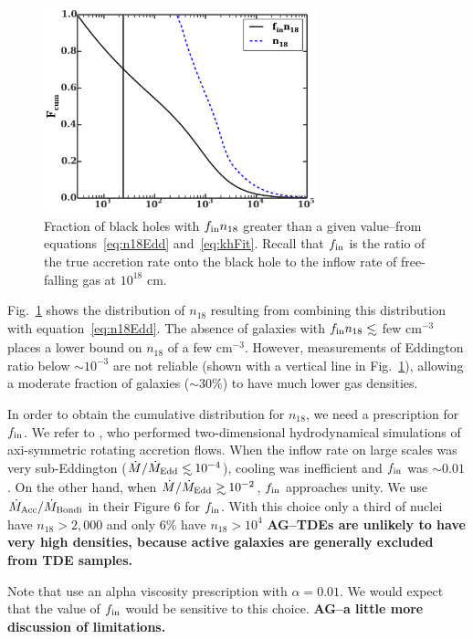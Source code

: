 \documentclass[usenatbib,fleqn]{mnras}
\newcommand\lsim{\mathrel{\rlap{\lower4pt\hbox{\hskip1pt$\sim$}}
    \raise1pt\hbox{$<$}}}
\newcommand\gsim{\mathrel{\rlap{\lower4pt\hbox{\hskip1pt$\sim$}}
    \raise1pt\hbox{$>$}}}
\begin{document}
\begin{figure}
\includegraphics[width=8cm]{fcum_n18.pdf}
\caption{\label{fig:n18Cum} Fraction of black holes with $f_{\rm in}
  n_{18}$ greater than a given value--from equations~\eqref{eq:n18Edd}
  and~\eqref{eq:khFit}. Recall that $f_{\rm in}$ is the ratio of the
  true accretion rate onto the black hole to the inflow rate of
  free-falling gas at $10^{18}$ cm.   
}
\end{figure}


Fig.~\ref{fig:n18Cum} shows the distribution of $n_{18}$ resulting
from combining this distribution with equation~\eqref{eq:n18Edd}.  The
absence of galaxies with $f_{\rm in }n_{18} \lsim$ few cm$^{-3}$
places a lower bound on $n_{18}$ of a few cm$^{-3}$.  However,
measurements of Eddington ratio below $\sim 10^{-3}$ are not reliable
(shown with a vertical line in Fig.~\ref{fig:n18Cum}), allowing
a moderate fraction of galaxies ($\sim 30\%$) to have much lower gas
densities.


In order to obtain the cumulative distribution for $n_{18}$, we need a
prescription for $f_{\rm in}$. We refer to \citet{Li+2013}, who
performed two-dimensional hydrodynamical simulations of axi-symmetric
rotating accretion flows. When the inflow rate on large scales was
very sub-Eddington ($\dot{M}/\dot{M}_{\rm Edd} \lsim 10^{-4}$),
cooling was inefficient and $f_{\rm in}$ was $\sim 0.01$. On the other
hand, when $\dot{M}/\dot{M}_{\rm Edd}\gsim 10^{-2}$, $f_{\rm in}$
approaches unity.  We use $\dot{M}_{\rm Acc}/\dot{M}_{\rm Bondi}$ in
their Figure 6 for $f_{\rm in}$.  With this choice only a third of
nuclei have $n_{18}>2,000$ and only 6\% have $n_{18}>10^{4}$ {\bf
  AG--TDEs are unlikely to have very high densities, because active
  galaxies are generally excluded from TDE samples.}

Note that \citet{Li+2013} use an alpha viscosity prescription with
$\alpha=0.01$. We would expect that the value of $f_{\rm in}$ would be
sensitive to this choice. {\bf AG--a little more discussion of limitations.}
\end{document}
